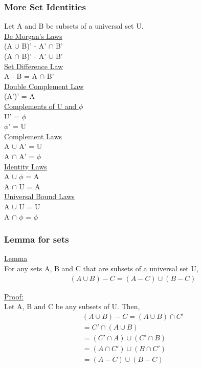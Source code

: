 \documentclass{article}
\begin{document}
\subsubsection{More Set Identities}

Let A and B be subsets of a universal set U. \\

\underline{De Morgan's Laws} \\
(A $\cup$ B)' - A' $\cap$ B' \\
(A $\cap$ B)' - A' $\cup$ B' \\

\underline{Set Difference Law} \\
A - B = A $\cap$ B' \\

\underline{Double Complement Law} \\
(A')' = A\\

\underline{Complements of U and $\phi$} \\
U' = $\phi$ \\
$\phi$' = U \\

\underline{Complement Laws} \\
A $\cup$ A' = U \\
A $\cap$ A' = $\phi$ \\

\underline{Identity Laws}\\
A $\cup$ $\phi$ = A \\
A $\cap$ U = A \\

\underline{Universal Bound Laws}\\
A $\cup$ U = U \\
A $\cap$ $\phi$ = $\phi$ \\

\subsubsection{Lemma for sets}

\underline{Lemma} \\
For any sets A, B and C that are subsets of a universal set U,
\begin{align}
(A \cup B)- C = (A - C) \cup (B - C)
\end{align}

\underline{Proof:} \\
Let A, B and C be any subsets of U. Then,
\begin{align}
(A \cup B) - C = (A \cup B) \cap C' \\
= C' \cap (A \cup B) \\
= (C' \cap A) \cup (C' \cap B) \\
= (A \cap C') \cup (B \cap C') \\
= (A - C) \cup (B - C)
\end{align}
\end{document}
